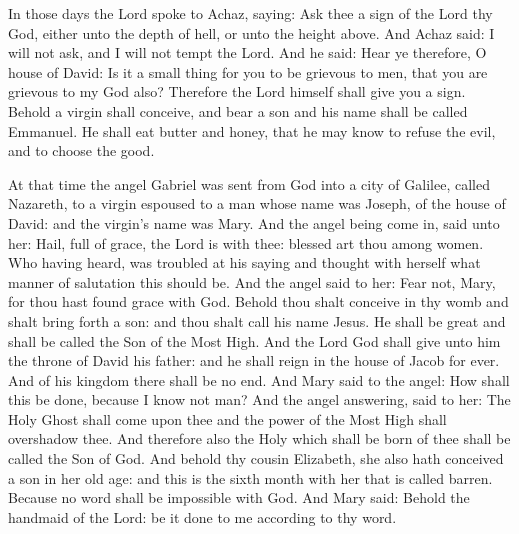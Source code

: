 \bigskip




In those days the Lord spoke to Achaz, saying:
Ask thee a sign of the Lord thy God, either unto the depth of
hell, or unto the height above.
And Achaz said: I will not ask, and I will not tempt the Lord.
And he said: Hear ye therefore, O house of David: Is it a small
thing for you to be grievous to men, that you are grievous to my God
also?
Therefore the Lord himself shall give you a sign. Behold a virgin
shall conceive, and bear a son and his name shall be called Emmanuel.
He shall eat butter and honey, that he may know to refuse the
evil, and to choose the good.


\columnbreak


At that time the angel Gabriel was sent from God into a
city of Galilee, called Nazareth,
to a virgin espoused to a man whose name was Joseph, of the house
of David: and the virgin's name was Mary.
And the angel being come in, said unto her: Hail, full of grace,
the Lord is with thee: blessed art thou among women.
Who having heard, was troubled at his saying and thought with
herself what manner of salutation this should be.
And the angel said to her: Fear not, Mary, for thou hast found
grace with God.
Behold thou shalt conceive in thy womb and shalt bring forth a
son: and thou shalt call his name Jesus.
He shall be great and shall be called the Son of the Most High.
And the Lord God shall give unto him the throne of David his father: and
he shall reign in the house of Jacob for ever.
And of his kingdom there shall be no end.
And Mary said to the angel: How shall this be done, because I know
not man?
And the angel answering, said to her: The Holy Ghost shall come
upon thee and the power of the Most High shall overshadow thee. And
therefore also the Holy which shall be born of thee shall be called the
Son of God.
And behold thy cousin Elizabeth, she also hath conceived a son in
her old age: and this is the sixth month with her that is called barren.
Because no word shall be impossible with God.
And Mary said: Behold the handmaid of the Lord: be it done to me
according to thy word. %


\bigskip

~

\bigskip

